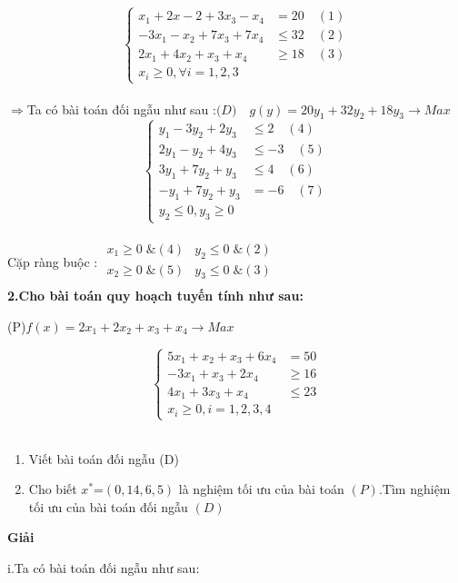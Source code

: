 \documentclass{article}
\begin{document}
\[\left\{\begin{aligned}
x_1+2x-2+3x_3-x_4&=20 \quad(1)\\
-3x_1-x_2+7x_3+7x_4&\leq 32 \quad(2)\\
2x_1+4x_2+x_3+x_4&\geq 18 \quad(3)\\
x_i\geq 0,\forall i=1,2,3
\end{aligned}\right.\]\\
$\Longrightarrow$Ta có bài toán đối ngẫu như sau :$ \big(D\big)\quad g(y)=20y_1+32y_2+18y_3 \longrightarrow Max$ \\
\[\left\{\begin{aligned}
y_1-3y_2+2y_3&\leq 2 \quad(4)\\
2y_1-y_2+4y_3&\leq-3 \quad(5)\\
3y_1+7y_2+y_3&\leq 4 \quad(6)\\
-y_1+7y_2+y_3&=-6 \quad(7)\\
y_2\leq 0,y_3\geq 0
\end{aligned}\right.\]\\
Cặp ràng buộc : $\begin{array}{cr} 
x_1\geq 0\; \&(4) &y_2\leq 0\; \&(2)\\
x_2\geq 0\; \&(5) &y_3\leq 0\; \&(3)\\
\end{array}$\\
\textbf{2.Cho bài toán quy hoạch tuyến tính như sau:}\\
\begin{center}
\big(P\big)\quad $f(x)=2x_1+2x_2+x_3+x_4 \longrightarrow Max$\\
\end{center}
\[\left\{\begin{aligned}
5x_1+x_2+x_3+6x_4&=50 \\
-3x_1+x_3+2x_4&\geq16 \\
4x_1+3x_3+x_4&\leq23 \\
x_i\geq 0,i=1,2,3,4 
\end{aligned}\right.\]\\
\begin{enumerate}
\item Viết bài toán đối ngẫu \big(D\big)
\item Cho biết $x^*$=$\left(0,14,6,5\right)$ là nghiệm tối ưu của bài toán $\left(P\right)$.Tìm nghiệm tối ưu của bài toán đối ngẫu $\left(D\right)$
\end{enumerate}
\begin{center}
\textbf{Giải}
\end{center}
i.Ta có bài toán đối ngẫu như sau:\\
\end{document}
